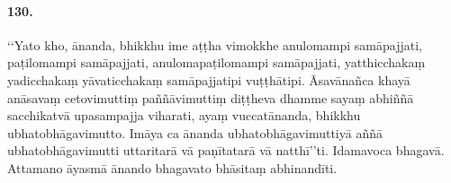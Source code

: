 \paragraph{130.} ‘‘Yato kho, ānanda, bhikkhu ime aṭṭha vimokkhe anulomampi samāpajjati, paṭilomampi samāpajjati, anulomapaṭilomampi samāpajjati, yatthicchakaṃ yadicchakaṃ yāvaticchakaṃ samāpajjatipi vuṭṭhātipi. Āsavānañca khayā anāsavaṃ cetovimuttiṃ paññāvimuttiṃ diṭṭheva dhamme sayaṃ abhiññā sacchikatvā upasampajja viharati, ayaṃ vuccatānanda, bhikkhu ubhatobhāgavimutto. Imāya ca ānanda ubhatobhāgavimuttiyā aññā ubhatobhāgavimutti uttaritarā vā paṇītatarā vā natthī’’ti. Idamavoca bhagavā. Attamano āyasmā ānando bhagavato bhāsitaṃ abhinandīti.

